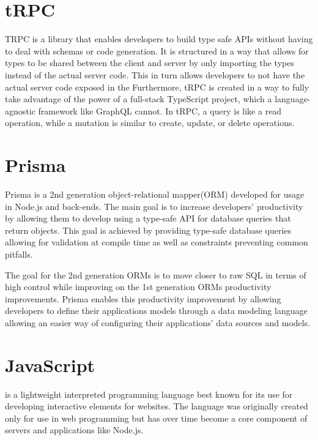 \section*{tRPC}
TRPC is a library that enables developers to build type safe APIs without having to deal with schemas or code generation. 
It is structured in a way that allows for types to be shared between the client and server by only importing the types instead of the actual server code. 
This in turn allows developers to not have the actual server code exposed in the \frontend{} 
Furthermore, tRPC is created in a way to fully take advantage of the power of a full-stack TypeScript project, which a language-agnostic framework like GraphQL cannot\cite{tRPC}.
In tRPC, a query is like a read operation, while a mutation is similar to create, update, or delete operations.

\section*{Prisma}
Prisma is a 2nd generation object-relational mapper(ORM) developed for usage in Node.js and \typescript{} back-ends. 
The main goal is to increase developers' productivity by allowing them to develop using a type-safe API for database queries that return \javascript{} objects. 
This goal is achieved by providing type-safe database queries allowing for validation at compile time as well as constraints preventing common pitfalls\cite{Prisma_Why}.

The goal for the 2nd generation ORMs is to move closer to raw SQL in terms of high control while improving on the 1st generation ORMs productivity improvements. 
Prisma enables this productivity improvement by allowing developers to define their applications models through a data modeling language allowing an easier way of configuring their applications' data sources and models\cite{Prisma_Doc}.

\section*{JavaScript}
\javascript{} is a lightweight interpreted programming language best known for its use for developing interactive elements for websites\cite{JavaScript_Mozilla}.
The language was originally created only for use in web programming but has over time become a core component of servers and applications like Node.js. 


